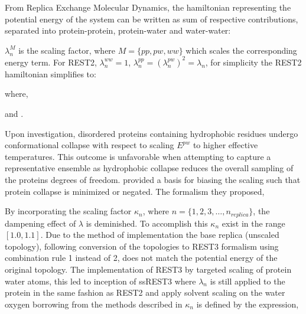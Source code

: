 From Replica Exchange Molecular Dynamics\cite{Sugita1999}, the hamiltonian representing the potential energy of the system can be written as sum of respective contributions, separated into protein-protein, protein-water and water-water:

$\lambda_{n}^M$ is the scaling factor, where $M=\{ pp, pw, ww\}
$ which scales the corresponding energy term. For REST2\cite{Wang2011}, $\lambda_n^{ww}=1$, $\lambda_n^{pp}=(\lambda_n^{pw})^2=\lambda_n$, for simplicity the REST2 hamiltonian simplifies to:

where,

and . 

Upon investigation, disordered proteins containing hydrophobic residues undergo conformational collapse with respect to scaling  $E^{pw}$ to higher effective temperatures. This outcome is unfavorable when attempting to capture a representative ensemble as hydrophobic collapse reduces the overall sampling of the proteins degrees of freedom. %
\citeauthor{Zhang2023} \citeyear{Zhang2023} provided a basis for biasing the scaling such that protein collapse is minimized or negated. The formalism they proposed,

By incorporating the scaling factor $\kappa_n$, where $n=\{1,2,3,\ldots,n_{replica}\}$, the dampening effect of $\lambda$ is deminished. To accomplish this $\kappa_n$ exist in the range $[1.0,1.1]$. Due to the method of implementation the base replica (unscaled topology), following conversion of the topologies to REST3 \cite{Zhang2023} formalism using combination rule 1 instead of 2, does not match the potential energy of the original topology. The implementation of REST3 by \citeauthor{Zhang2023} targeted scaling of protein water atoms, this led to inception of ssREST3 where $\lambda_n$ is still applied to the protein in the same fashion as REST2 \cite{Wang2011} and apply solvent scaling on the water oxygen borrowing from the methods described in $\kappa_n$ is defined by the expression, 








